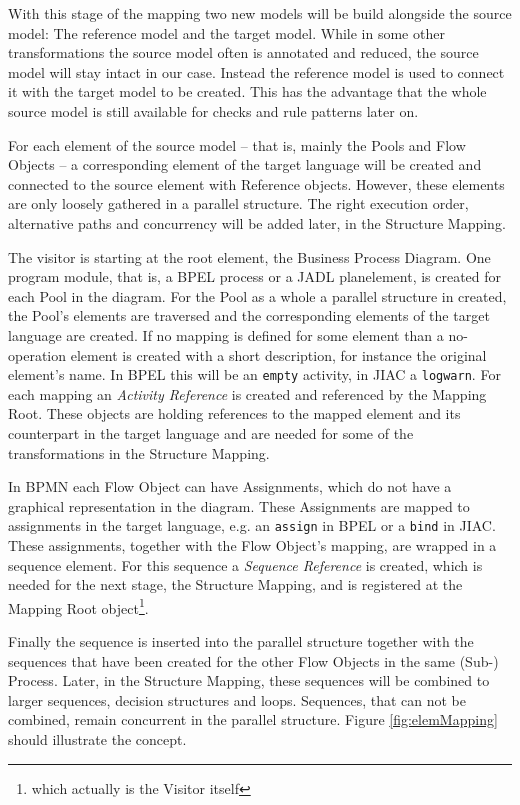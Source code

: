 With this stage of the mapping two new models will be build alongside the source model: The reference model and the target model. While in some other transformations the source model often is annotated and reduced, the source model will stay intact in our case. Instead the reference model is used to connect it with the target model to be created. This has the advantage that the whole source model is still available for checks and rule patterns later on.

For each element of the source model -- that is, mainly the Pools and Flow Objects -- a corresponding element of the target language will be created and connected to the source element with Reference objects. However, these elements are only loosely gathered in a parallel structure. The right execution order, alternative paths and concurrency will be added later, in the Structure Mapping.

The visitor is starting at the root element, the Business Process Diagram. One program module, that is, a BPEL process or a JADL planelement, is created for each Pool in the diagram. For the Pool as a whole a parallel structure in created, the Pool's elements are traversed and the corresponding elements of the target language are created. If no mapping is defined for some element than a no-operation element is created with a short description, for instance the original element's name. In BPEL this will be an \verb|empty| activity, in JIAC a \verb|logwarn|. For each mapping an \emph{Activity Reference} is created and referenced by the Mapping Root. These objects are holding references to the mapped element and its counterpart in the target language and are needed for some of the transformations in the Structure Mapping.

In BPMN each Flow Object can have Assignments, which do not have a graphical representation in the diagram. These Assignments are mapped to assignments in the target language, e.g. an \verb|assign| in BPEL or a \verb|bind| in JIAC. These assignments, together with the Flow Object's mapping, are wrapped in a sequence element. For this sequence a \emph{Sequence Reference} is created, which is needed for the next stage, the Structure Mapping, and is registered at the Mapping Root object\footnote{which actually is the Visitor itself}.

Finally the sequence is inserted into the parallel structure together with the sequences that have been created for the other Flow Objects in the same (Sub-) Process. Later, in the Structure Mapping, these sequences will be combined to larger sequences, decision structures and loops. Sequences, that can not be combined, remain concurrent in the parallel structure. Figure \ref{fig:elemMapping} should illustrate the concept.

